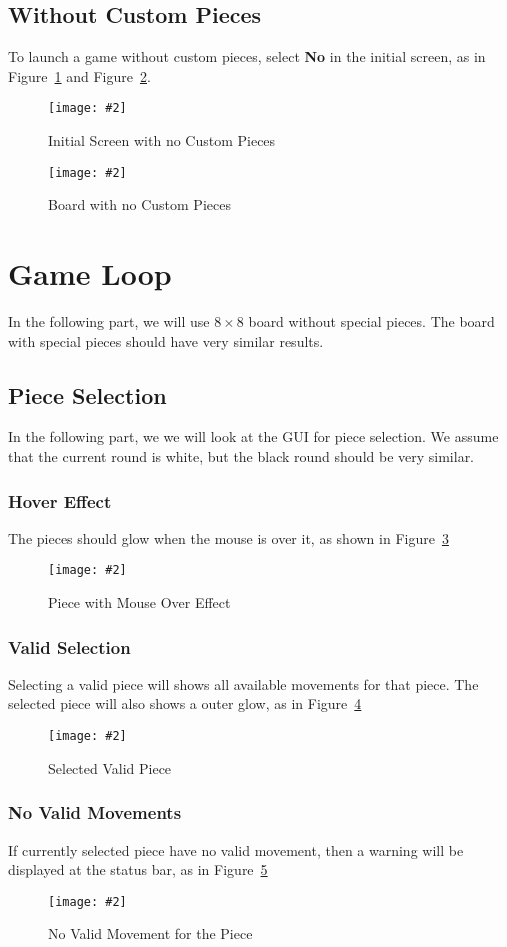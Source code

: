 \documentclass[12pt]{article}
\newcommand{\img}[3]{
\begin{figure}[!ht]
\begin{center}
\texttt{[image: \#2]}
\caption{#3}\label{#2}
\end{center}
\end{figure}
}
\newcommand{\B}[1]{\textbf{#1}}
\begin{document}
\subsection{Without Custom Pieces}
To launch a game without custom pieces, select \B{No} in the initial screen, as in Figure~\ref{init_no_custom} and Figure~\ref{board_no_custom}.
\img{0.7}{init_no_custom}{Initial Screen with no Custom Pieces}
\img{0.45}{board_no_custom}{Board with no Custom Pieces}


\section{Game Loop}

In the following part, we will use $8\times8$ board without special pieces. The board with special pieces should have very similar results.

\subsection{Piece Selection}
In the following part, we we will look at the GUI for piece selection. We assume that the current round is white, but the black round should be very similar.

\subsubsection{Hover Effect}
The pieces should glow when the mouse is over it, as shown in Figure~\ref{board_hover}
\img{0.4}{board_hover}{Piece with Mouse Over Effect}


\subsubsection{Valid Selection}
Selecting a valid piece will shows all available movements for that piece. The selected piece will also shows a outer glow, as in Figure~\ref{board_select_piece}
\img{0.4}{board_select_piece}{Selected Valid Piece}



\subsubsection{No Valid Movements}
If currently selected piece have no valid movement, then a warning will be displayed at the status bar, as in Figure~\ref{board_no_movement}
\img{0.4}{board_no_movement}{No Valid Movement for the Piece}
\end{document}
